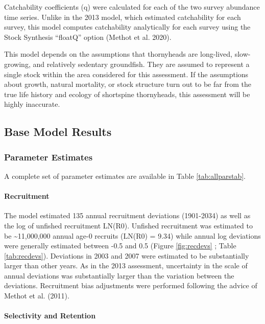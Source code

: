 \documentclass[11pt,
  english,
  letterpaper,
]{article}
\begin{document}
Catchability coefficients (q) were calculated for each of the two survey abundance time series. Unlike in the 2013 model, which estimated catchability for each survey, this model computes catchability analytically for each survey using the Stock Synthesis ``floatQ'' option (Methot et al. 2020).

This model depends on the assumptions that thornyheads are long-lived, slow-growing, and relatively sedentary groundfish. They are assumed to represent a single stock within the area considered for this assessment. If the assumptions about growth, natural mortality, or stock structure turn out to be far from the true life history and ecology of shortspine thornyheads, this assessment will be highly inaccurate.

\hypertarget{base-model-results}{%
\subsection{Base Model Results}\label{base-model-results}}

\hypertarget{parameter-estimates}{%
\subsubsection{Parameter Estimates}\label{parameter-estimates}}

A complete set of parameter estimates are available in Table \ref{tab:allparstab}.

\hypertarget{recruitment-1}{%
\paragraph{Recruitment}\label{recruitment-1}}

The model estimated 135 annual recruitment deviations (1901-2034) as well as the log of unfished recruitment LN(R0). Unfished recruitment was estimated to be \textasciitilde11,000,000 annual age-0 recruits (LN(R0) = 9.34) while annual log deviations were generally estimated between -0.5 and 0.5 (Figure \ref{fig:recdevs} ; Table \ref{tab:recdevs}). Deviations in 2003 and 2007 were estimated to be substantially larger than other years. As in the 2013 assessment, uncertainty in the scale of annual deviations was substantially larger than the variation between the deviations. Recruitment bias adjustments were performed following the advice of Methot et al. (2011).

\hypertarget{selectivity-and-retention-1}{%
\paragraph{Selectivity and Retention}\label{selectivity-and-retention-1}}
\end{document}

